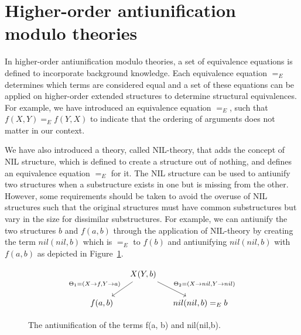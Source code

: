\section{Higher-order antiunification modulo theories}   \label{HOAUMT}
In higher-order antiunification modulo theories, a set of equivalence equations is defined to incorporate background knowledge. Each equivalence equation $=_E$ determines which terms are considered equal and a set of these equations can be applied on higher-order extended structures to determine structural equivalences. For example, we have introduced an equivalence equation $=_E$, such that $f(X,Y) =_E f(Y,X)$ to indicate that the ordering of arguments does not matter in our context.

We have also introduced a theory, called NIL-theory, that adds the concept of NIL structure, which is defined to create a structure out of nothing, and defines an equivalence equation $=_E$ for it. The NIL structure can be used to antiunify two structures when a substructure exists in one but is missing from the other. However, some requirements should be taken to avoid the overuse of NIL structures such that the original structures must have common substructures but vary in the size for dissimilar substructures. For example, we can antiunify the two structures $b$ and $f(a,b)$ through the application of NIL-theory by creating the term $nil(nil,b)$ which is $=_E$ to $f(b)$ and antiunifying $nil(nil,b)$ with $f(a,b)$ as depicted in Figure~\ref{fig:anti-nil}.
\begin{figure} [H]
\[
\begin{tikzcd}[column sep=small]
&
  X(Y,b)
  \arrow{dr}{\Theta_2 = ( X \rightarrow nil, Y \rightarrow nil) }
  \arrow[->,swap]{dl}{\Theta_1 = ( X \rightarrow f, Y \rightarrow a)} %
\\
f(a,b)
&&
nil(nil,b) =_E  b
\end{tikzcd}
\]
  \caption{ The antiunification of the terms f(a, b) and nil(nil,b).}
  \label{fig:anti-nil}
\end{figure}


